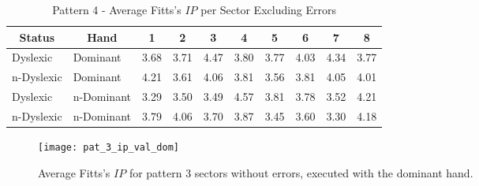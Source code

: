 		\begin{table}[h]
			\centering
			\caption{Pattern 4 - Average Fitts's \(IP\) per Sector Excluding Errors}
			\label{tab_pat_4_ip}
			\begin{tabularx}{\textwidth}{|l|l|X|X|X|X|X|X|X|X|}
				\hline
				\multicolumn{1}{|c|}{\textbf{Status}} & \multicolumn{1}{c|}{\textbf{Hand}} & \multicolumn{1}{c|}{\textbf{1}} & \multicolumn{1}{c|}{\textbf{2}} & \multicolumn{1}{c|}{\textbf{3}} & \multicolumn{1}{c|}{\textbf{4}} & \multicolumn{1}{c|}{\textbf{5}} & \multicolumn{1}{c|}{\textbf{6}} & \multicolumn{1}{c|}{\textbf{7}} & \multicolumn{1}{c|}{\textbf{8}} \\ \hline
				Dyslexic                              & Dominant                           & 3.68                            & 3.71                            & 4.47                            & 3.80                            & 3.77                            & 4.03                            & 4.34                            & 3.77                            \\ \hline
				n-Dyslexic                          & Dominant                           & 4.21                            & 3.61                            & 4.06                            & 3.81                            & 3.56                            & 3.81                            & 4.05                            & 4.01                            \\ \hline
				Dyslexic                              & n-Dominant                       & 3.29                            & 3.50                            & 3.49                            & 4.57                            & 3.81                            & 3.78                            & 3.52                            & 4.21                            \\ \hline
				n-Dyslexic                          & n-Dominant                       & 3.79                            & 4.06                            & 3.70                            & 3.87                            & 3.45                            & 3.60                            & 3.30                            & 4.18                            \\ \hline
			\end{tabularx}
		\end{table}		
	
		\begin{figure}[h]
		\centering
		\texttt{[image: pat\_3\_ip\_val\_dom]}
		\caption{Average Fitts's \(IP\) for pattern 3 sectors without errors, executed with the dominant hand.}
		\label{fig_pat_3_ip_dom}
	\end{figure}		
	
